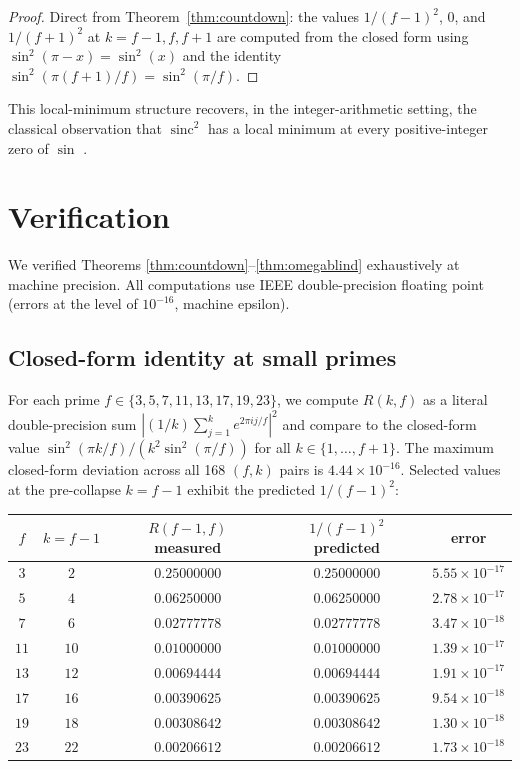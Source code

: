 \documentclass[11pt,reqno]{amsart}
\theoremstyle{plain}
\theoremstyle{definition}
\theoremstyle{remark}
\DeclareMathOperator{\sinc}{sinc}
\begin{document}
\begin{proof}
Direct from Theorem~\ref{thm:countdown}: the values $1/(f-1)^2$,
$0$, and $1/(f+1)^2$ at $k = f-1, f, f+1$ are computed from the
closed form using $\sin^2(\pi - x) = \sin^2(x)$ and the identity
$\sin^2(\pi(f+1)/f) = \sin^2(\pi/f)$.
\end{proof}

This local-minimum structure recovers, in the integer-arithmetic
setting, the classical observation that $\sinc^2$ has a local
minimum at every positive-integer zero of $\sin$
\cite{OppenheimSchafer2010}.

\section{Verification}
\label{sec:verification}

We verified Theorems \ref{thm:countdown}--\ref{thm:omegablind}
exhaustively at machine precision. All computations use IEEE
double-precision floating point (errors at the level of
$10^{-16}$, machine epsilon).

\subsection{Closed-form identity at small primes}

For each prime $f \in \{3, 5, 7, 11, 13, 17, 19, 23\}$, we compute
$R(k, f)$ as a literal double-precision sum
$|(1/k) \sum_{j=1}^{k} e^{2\pi i j / f}|^2$ and compare to the
closed-form value $\sin^2(\pi k / f) / (k^2 \sin^2(\pi / f))$ for
all $k \in \{1, \ldots, f+1\}$. The maximum closed-form deviation
across all 168 $(f, k)$ pairs is $4.44 \times 10^{-16}$. Selected
values at the pre-collapse $k = f - 1$ exhibit the predicted
$1/(f-1)^2$:
\begin{center}
\begin{tabular}{c|c|c|c|c}
\toprule
$f$ & $k = f - 1$ & $R(f-1, f)$ measured & $1 / (f-1)^2$ predicted & error \\
\midrule
$3$  & $2$  & $0.25000000$  & $0.25000000$  & $5.55 \times 10^{-17}$ \\
$5$  & $4$  & $0.06250000$  & $0.06250000$  & $2.78 \times 10^{-17}$ \\
$7$  & $6$  & $0.02777778$  & $0.02777778$  & $3.47 \times 10^{-18}$ \\
$11$ & $10$ & $0.01000000$  & $0.01000000$  & $1.39 \times 10^{-17}$ \\
$13$ & $12$ & $0.00694444$  & $0.00694444$  & $1.91 \times 10^{-17}$ \\
$17$ & $16$ & $0.00390625$  & $0.00390625$  & $9.54 \times 10^{-18}$ \\
$19$ & $18$ & $0.00308642$  & $0.00308642$  & $1.30 \times 10^{-18}$ \\
$23$ & $22$ & $0.00206612$  & $0.00206612$  & $1.73 \times 10^{-18}$ \\
\bottomrule
\end{tabular}
\end{center}
\end{document}
